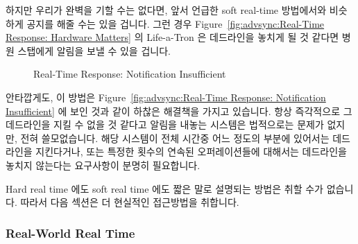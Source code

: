 하지만 우리가 완벽을 기할 수는 없다면, 앞서 언급한 soft real-time 방법에서와
비슷하게 공지를 해줄 수는 있을 겁니다.
그런 경우
Figure~\ref{fig:advsync:Real-Time Response: Hardware Matters} 의 Life-a-Tron 은
데드라인을 놓치게 될 것 같다면 병원 스탭에게 알림을 보낼 수 있을 겁니다.

\begin{figure}[bt]
\centering
{}
\caption{Real-Time Response: Notification Insufficient}
\end{figure}

안타깝게도, 이 방법은
Figure~\ref{fig:advsync:Real-Time Response: Notification Insufficient} 에 보인
것과 같이 하찮은 해결책을 가지고 있습니다.
항상 즉각적으로 그 데드라인을 지킬 수 없을 것 같다고 알림을 내놓는 시스템은
법적으로는 문제가 없지만, 전혀 쓸모없습니다.
해당 시스템이 전체 시간중 어느 정도의 부분에 있어서는 데드라인을 지킨다거나,
또는 특정한 횟수의 연속된 오퍼레이션들에 대해서는 데드라인을 놓치지 않는다는
요구사항이 분명히 필요합니다.

Hard real time 에도 soft real time 에도 짧은 말로 설명되는 방법은 취할 수가
없습니다.
따라서 다음 섹션은 더 현실적인 접근방법을 취합니다.

\subsubsection{Real-World Real Time}
\label{sec:advsync:Real-World Real Time}

